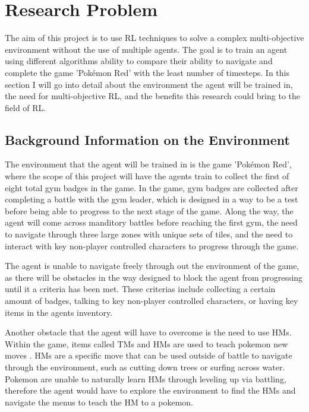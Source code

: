 \section{Research Problem}

The aim of this project is to use RL techniques to solve a complex multi-objective environment without the use of multiple agents. The goal is to train an agent using different algorithms ability to compare their ability to navigate and complete the game 'Pokémon Red' with the least number of timesteps. In this section I will go into detail about the environment the agent will be trained in, the need for multi-objective RL, and the benefits this research could bring to the field of RL.

\subsection{Background Information on the Environment}

The environment that the agent will be trained in is the game 'Pokémon Red', where the scope of this project will have the agents train to collect the first of eight total gym badges in the game. In the game, gym badges are collected after completing a battle with the gym leader, which is designed in a way to be a test before being able to progress to the next stage of the game. Along the way, the agent will come across manditory battles before reaching the first gym, the need to navigate through three large zones with unique sets of tiles, and the need to interact with key non-player controlled characters to progress through the game. 

The agent is unable to navigate freely through out the environment of the game, as there will be obstacles in the way designed to block the agent from progressing until it a criteria has been met. These criterias include collecting a certain amount of badges, talking to key non-player controlled characters, or having key items in the agents inventory.  

Another obstacle that the agent will have to overcome is the need to use HMs. Within the game, items called TMs and HMs are used to teach pokemon new moves \cite{SerebiiTeam2016}. HMs are a specific move that can be used outside of battle to navigate through the environment, such as cutting down trees or surfing across water. Pokemon are unable to naturally learn HMs through leveling up via battling, therefore the agent would have to explore the environment to find the HMs and navigate the menus to teach the HM to a pokemon.

